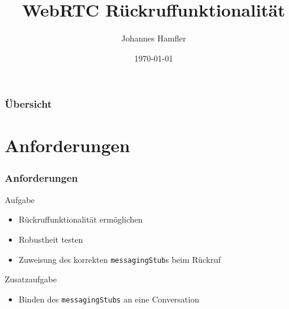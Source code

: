 \documentclass{beamer}
\title[WebRTC Rückruf]{WebRTC Rückruffunktionalität} %
\author{Johannes Hamfler} %
\institute[HfTL] %
{
Hochschule für Telekommunikation Leipzig \\ %
\medskip
\textit{johannes.hamfler@hftl.de} %
}
\date{\today} %
\begin{document}
\begin{frame}
\titlepage %
\end{frame}

\begin{frame}
\frametitle{Übersicht} %
\tableofcontents %
\end{frame}


\section{Anforderungen}
\begin{frame}
	\frametitle{Anforderungen}
	\begin{block}{Aufgabe}
		\begin{itemize}
			\item Rückruffunktionalität ermöglichen
			\item Robustheit testen
			\item Zuweisung des korrekten \texttt{messagingStub}s beim Rückruf
		\end{itemize}
	\end{block}
	\begin{block}{Zusatzaufgabe}
		\begin{itemize}
			\item Binden des \texttt{messagingStubs} an eine Conversation
		\end{itemize}
	\end{block}
\end{frame}

\end{document}
